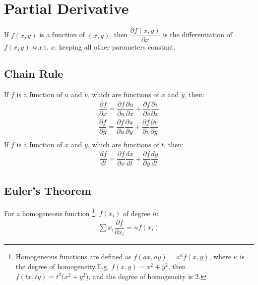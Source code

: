 \documentclass[../main.tex]{subfile}
\begin{document}
    \chapter{Partial Derivative}
    If $f(x,y)$ is a function of $(x,y)$, then $\dfrac{\partial f(x,y)}{\partial x}$ is the differentiation of $f(x,y)$ w.r.t. $x$, keeping all other parameters constant.
    \section{Chain Rule}
    If $f$ is a function of $u$ and $v$, which are functions of $x$ and $y$, then:
    \begin{align}
    \dfrac{\partial f}{\partial x}=\dfrac{\partial f}{\partial u}\dfrac{\partial u}{\partial x}+\dfrac{\partial f}{\partial v}\dfrac{\partial v}{\partial x}\\
    \dfrac{\partial f}{\partial y}=\dfrac{\partial f}{\partial u}\dfrac{\partial u}{\partial y}+\dfrac{\partial f}{\partial v}\dfrac{\partial v}{\partial y}\\
    \end{align}
    If $f$ is a function of $x$ and $y$, which are functions of $t$, then:
    \begin{align}
    \dfrac{df}{dt}=\dfrac{\partial f}{\partial x}\dfrac{dx}{dt}+\dfrac{\partial f}{\partial y}\dfrac{dy}{dt}
    \end{align}
    
    \section{Euler's Theorem}
    For a homogeneous function \footnote{Homogeneous functions are defined as $f(ax,ay)=a^\kappa f(x,y)$, where $\kappa$ is the degree of homogeneity.\newline E.g. $f(x,y)=x^2+y^2$, then $f(tx,ty)=t^2(x^2+y^2$), and the degree of homogeneity is $2$.}, $f(x_i)$ of degree $n$:
    \begin{align}
    \sum x_i\dfrac{\partial f}{\partial x_i}=nf(x_i)
    \end{align}
\end{document}
